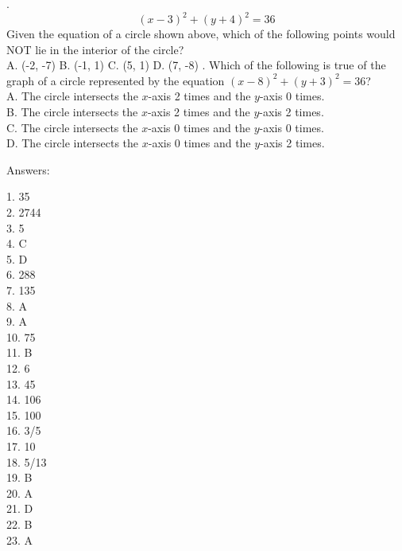 \documentclass[../satmath.tex]{subfiles}
\begin{document}
. 
\[(x-3)^2+(y+4)^2=36\]
Given the equation of a circle shown above, which of the following points would NOT lie in the interior of the circle?\\
A. (-2, -7) \quad B. (-1, 1) \quad C. (5, 1) \quad D. (7, -8)
. Which of the following is true of the graph of a circle represented by the equation $(x-8)^2+(y+3)^2=36$?\\
A. The circle intersects the $x$-axis 2 times and the $y$-axis 0 times. \\
B. The circle intersects the $x$-axis 2 times and the $y$-axis 2 times.\\
C. The circle intersects the $x$-axis 0 times and the $y$-axis 0 times. \\
D. The circle intersects the $x$-axis 0 times and the $y$-axis 2 times.
\medbreak 

Answers:

1. 35\\
2. 2744\\
3. 5\\
4. C\\
5. D\\
6. 288\\
7. 135\\
8. A\\
9. A\\
10. 75\\
11. B\\
12. 6\\
13. 45\\
14. 106\\
15. 100\\
16. 3/5\\
17. 10\\
18. 5/13\\
19. B\\
20. A\\
21. D\\
22. B\\
23. A
\end{document}
